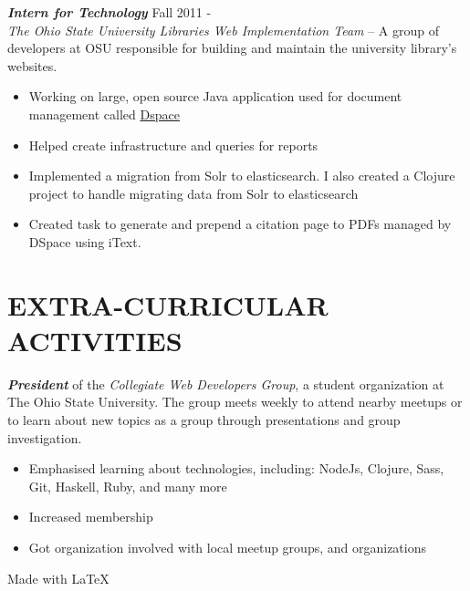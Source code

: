 \documentclass[line,letterpaper]{resume}
\begin{document}
\begin{resume}
    {\sl\textbf{Intern for Technology}} \hfill Fall 2011 - \\
    \emph{The Ohio State University Libraries Web Implementation Team} -- A
    group of developers at OSU responsible for building and maintain the
    university library's websites.
    \begin{itemize}  
        \item Working on large, open source Java application used for document
        management called
        \href{https://github.com/osulibraries/DSpaceOSUKB/wiki}{Dspace}
        \item Helped create infrastructure and queries for reports
        \item Implemented a migration from Solr to elasticsearch. I also created
            a Clojure project to handle migrating data from Solr to
            elasticsearch
        \item Created task to generate and prepend a citation page to PDFs
            managed by DSpace using iText.
    \end{itemize} 

    \vspace{-6pt}

    \section{\uppercase{Extra-Curricular Activities}}             
    \emph{\textbf{President}} of the \emph{Collegiate Web Developers Group}, a
    student organization at The Ohio State University. The group meets weekly to
    attend nearby meetups or to learn about new topics as a group through
    presentations and group investigation.
    \begin{itemize}
        \item Emphasised learning about technologies, including:
            NodeJs, Clojure, Sass, Git, Haskell, Ruby, and many more
        \item Increased membership
        \item Got organization involved with local meetup groups, and
            organizations
    \end{itemize}

\end{resume}
\hfill Made with \LaTeX{}
\end{document}
